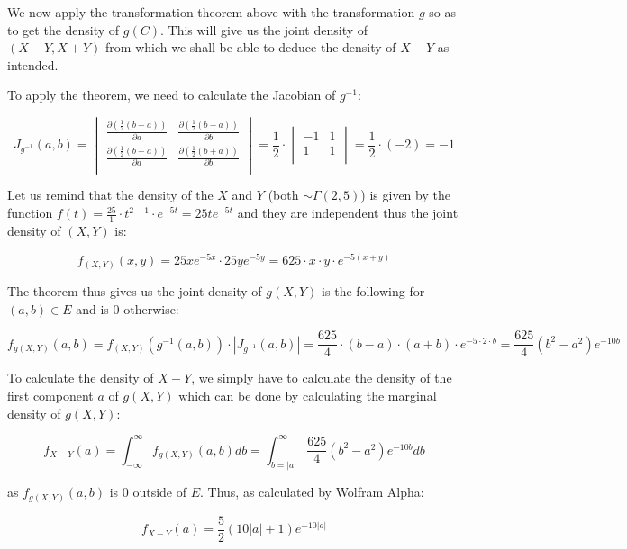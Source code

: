 \documentclass{article}
\begin{document}
We now apply the transformation theorem above with the transformation $g$ so as to get the density of $g(C)$. This will give us the joint density of $(X-Y,X+Y)$ from which we shall be able to deduce the density of $X-Y$ as intended. 

To apply the theorem, we need to calculate the Jacobian of $g^{-1}$: 

\renewcommand\arraystretch{2}
$$J_{g^{-1}}(a,b) = \begin{vmatrix}
\frac{\partial(\frac{1}{2}(b-a))}{\partial a}       & \frac{\partial(\frac{1}{2}(b-a))}{\partial b}\\
\frac{\partial(\frac{1}{2}(b+a))}{\partial a}       & \frac{\partial(\frac{1}{2}(b+a))}{\partial b}\\
\end{vmatrix} 
= 
\frac{1}{2}\cdot \begin{vmatrix}
-1       & 1 \\
1       & 1\\
\end{vmatrix} = \frac{1}{2}\cdot(-2) = -1$$

Let us remind that the density of the $X$ and $Y$ (both $\sim \Gamma(2,5)$) is given by the function $f(t) = \frac{25}{1}\cdot t^{2-1}\cdot e^{-5t} = 25te^{-5t}$ and they are independent thus the joint density of $(X,Y)$  is:

$$f_{(X,Y)}(x,y) = 25xe^{-5x} \cdot 25ye^{-5y} = 625\cdot x \cdot y \cdot e^{-5(x+y)}$$

The theorem thus gives us the joint density of $g(X,Y)$ is the following for $(a,b)\in E$ and is $0$ otherwise:

$$f_{g(X,Y)}(a,b) = f_{(X,Y)}(g^{-1}(a,b))\cdot | J_{g^{-1}}(a,b)| = \frac{625}{4}\cdot (b-a) \cdot (a+b) \cdot e^{-5\cdot 2\cdot b} = \frac{625}{4}(b^2-a^2)e^{-10b}$$ 

To calculate the density of $X-Y$, we simply have to calculate the density of the first component $a$ of $g(X,Y)$ which can be done by calculating the marginal density of $g(X,Y)$:

$$f_{X-Y}(a) = \int_{-\infty}^\infty f_{g(X,Y)}(a,b)db = \int_{b=|a|}^\infty \frac{625}{4}(b^2-a^2)e^{-10b} db$$

as $f_{g(X,Y)}(a,b)$ is $0$ outside of $E$. Thus, as calculated by Wolfram Alpha:

$$ f_{X-Y}(a) = \frac{5}{2}(10|a|+1)e^{-10|a|} $$





\end{document}
